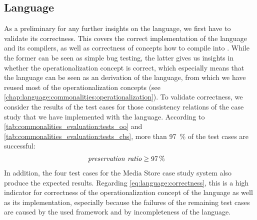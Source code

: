 

\subsection*{\Commonalities Language}

As a preliminary for any further insights on the \commonalities language, we first have to validate its correctness.
This covers the correct implementation of the language and its compilers, as well as correctness of concepts how to compile \commonalities into \reactions.
While the former can be seen as simple bug testing, the latter gives us insights in whether the operationalization concept is correct, which especially means that the language can be seen as an derivation of the \mappings language, from which we have reused most of the operationalization concepts (see \autoref{chap:language:commonalities:operationalization}).
To validate correctness, we consider the results of the test cases for those consistency relations of the case study that we have implemented with the \commonalities language.
According to \autoref{tab:commonalities_evaluation:tests_oo} and \autoref{tab:commonalities_evaluation:tests_cbs}, more than \SI{97}{\percent} of the test cases are successful:
\begin{align*}
    &
    \mathit{preservation\ ratio} \ge \SI{97}{\percent}
\end{align*}
In addition, the four test cases for the Media Store case study system also produce the expected results.
Regarding \autoref{eq:language:correctness}, this is a high indicator for correctness of the operationalization concept of the \commonalities language as well as its implementation, especially because the failures of the remaining test cases are caused by the used \vitruv framework and by incompleteness of the \commonalities language.

